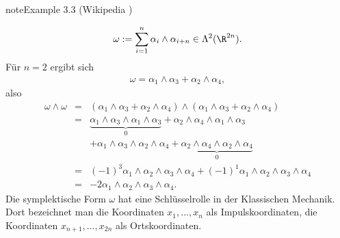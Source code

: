 \documentclass[letterpaper,10pt,english]{jupyterBook}
\begin{document}
\begin{sphinxadmonition}{note}{Example 3.3 (Wikipedia )}


\begin{equation*}
\begin{split}\omega := \sum_{i=1}^n\alpha_i\wedge\alpha_{i+n}\in\Lambda^2(\R^{2n}).\end{split}
\end{equation*}
\sphinxAtStartPar
Für \(n=2\) ergibt sich
\begin{equation*}
\begin{split}\omega = \alpha_1\wedge\alpha_3+\alpha_2\wedge\alpha_4,\end{split}
\end{equation*}
\sphinxAtStartPar
also
\begin{equation*}
\begin{split}\omega\wedge\omega &=& (\alpha_1\wedge\alpha_3+\alpha_2\wedge\alpha_4)
\wedge(\alpha_1\wedge\alpha_3+\alpha_2\wedge\alpha_4)\\
&=& \underbrace{\alpha_1\wedge\alpha_3\wedge\alpha_1\wedge\alpha_3}_0 +
\alpha_2\wedge\alpha_4\wedge\alpha_1\wedge\alpha_3\\
&& + \alpha_1\wedge\alpha_3\wedge\alpha_2\wedge\alpha_4 + \underbrace
{\alpha_2\wedge\alpha_4\wedge\alpha_2\wedge\alpha_4}_0\\
&=& (-1)^3\alpha_1\wedge\alpha_2\wedge\alpha_3\wedge\alpha_4 +
(-1)^1\alpha_1\wedge\alpha_2\wedge\alpha_3\wedge\alpha_4\\
&=& -2\alpha_1\wedge\alpha_2\wedge\alpha_3\wedge\alpha_4.\end{split}
\end{equation*}
\sphinxAtStartPar
Die symplektische Form \(\omega\) hat eine Schlüsselrolle in der Klassischen Mechanik. Dort bezeichnet man die Koordinaten \(x_1,\ldots,
x_n\) als Impulskoordinaten, die Koordinaten \(x_{n+1},\ldots, x_{2n}\) als
Ortskoordinaten.
\end{sphinxadmonition}
\label{vektoranalysis/multilinear:example-19}
\end{document}
